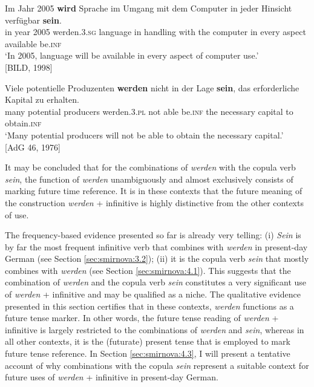 \documentclass[output=paper,colorlinks,citecolor=brown]{langscibook}
\begin{document}
\ea\label{ex:smirnova:26}
\gll Im Jahr 2005 \textbf{wird} Sprache im Umgang mit dem Computer in jeder Hinsicht verfügbar \textbf{sein}. \\
    in year 2005 werden.\textsc{3.sg} language in handling with the computer in every aspect available be.\textsc{inf} \\
\glt `In 2005, language will be available in every aspect of computer use.'\\
\hfill [BILD, 1998]
\z

\ea\label{ex:smirnova:27}
\gll Viele potentielle Produzenten \textbf{werden} nicht {in der Lage} \textbf{sein}, das erforderliche Kapital zu erhalten. \\
    many potential producers werden.\textsc{3.pl} not able be.\textsc{inf} the necessary capital to obtain.\textsc{inf}\\
\glt `Many potential producers will not be able to obtain the necessary capital.'\\
\hfill [AdG 46, 1976]
\z

It may be concluded that for the combinations of \textit{werden} with the copula verb \textit{sein}, the function of \textit{werden} unambiguously and almost exclusively consists of marking future time reference. It is in these contexts that the future meaning of the construction \textit{werden} + infinitive is highly distinctive from the other contexts of use. 
\par The frequency-based evidence presented so far is already very telling: (i) \textit{Sein} is by far the most frequent infinitive verb that combines with \textit{werden} in present-day German (see Section \ref{sec:smirnova:3.2}); (ii) it is the copula verb \textit{sein} that mostly combines with \textit{werden} (see Section \ref{sec:smirnova:4.1}). This suggests that the combination of \textit{werden} and the copula verb \textit{sein} constitutes a very significant use of \textit{werden} + infinitive and may be qualified as a niche. The qualitative evidence presented in this section certifies that in these contexts, \textit{werden} functions as a future tense marker. In other words, the future tense reading of \textit{werden} + infinitive is largely restricted to the combinations of \textit{werden} and \textit{sein}, whereas in all other contexts, it is the (futurate) present tense that is employed to mark future tense reference. In Section \ref{sec:smirnova:4.3}, I will present a tentative account of why combinations with the copula \textit{sein} represent a suitable context for future uses of \textit{werden} + infinitive in present-day German. 
\end{document}
